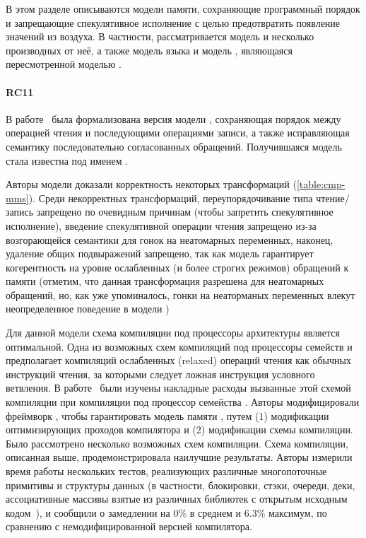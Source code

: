 В этом разделе описываются модели памяти, 
сохраняющие программный порядок и запрещающие 
спекулятивное исполнение с целью 
предотвратить появление значений из воздуха. 
В частности, рассматривается модель \RCMM
и несколько производных от неё, 
а также модель языка \OCaml и модель \JAM, 
являющаяся пересмотренной моделью \Java.  

\paragraph{RC11}

В работе~\cite{Lahav-al:PLDI17} была формализована
версия модели \CMM, сохраняющая порядок между 
операцией чтения и последующими операциями записи, 
а также исправляющая семантику последовательно согласованных обращений. 
Получившаяся модель стала известна под именем \RCMM. 

Авторы модели доказали корректность некоторых трансформаций 
(\see \cref{table:cmp-mms}).
Среди некорректных трансформаций, 
переупорядочивание типа чтение/запись запрещено 
по очевидным причинам (чтобы запретить спекулятивное исполнение), 
введение спекулятивной операции чтения запрещено 
из-за возгорающейся семантики для гонок на неатомарных переменных, 
наконец, удаление общих подвыражений запрещено, 
так как модель гарантирует когерентность 
на уровне ослабленных (и более строгих режимов) обращений к памяти
(отметим, что данная трансформация разрешена 
для неатомарных обращений, но, как уже упоминалось, 
гонки на неаторманых переменных влекут неопределенное поведение
в модели \RCMM) 

Для данной модели схема компиляции под процессоры архитектуры 
\Intel является оптимальной. Одна из возможных 
схем компиляций под процессоры семейств \ARM и \POWER
предполагает компиляций ослабленных (relaxed) операций чтения
как обычных инструкций чтения, за которыми следует 
ложная инструкция условного ветвления. 
В работе~\cite{Ou-Demsky:OOPSLA18} были изучены 
накладные расходы вызванные этой схемой компиляции
при компиляции под процессор семейства . 
Авторы модифицировали фреймворк \LLVM,
чтобы гарантировать модель памяти \RCMM, 
путем (1) модификации оптимизирующих проходов компилятора
и (2) модификации схемы компиляции. 
Было рассмотрено несколько возможных схем компиляции. 
Схема компиляции, описанная выше, продемонстрировала наилучшие результаты. 
Авторы измерили время работы нескольких тестов, 
реализующих различные многопоточные примитивы и структуры данных
(в частности, блокировки, стэки, очереди, деки, ассоциативные массивы
взятые из различных библиотек с открытым 
исходным кодом~\cite{CDSLib, FollyLib, JunctionLib}), 
и сообщили о замедлении на 0\% в среднем и 6.3\% максимум,
по сравнению с немодифицированной версией компилятора. 

